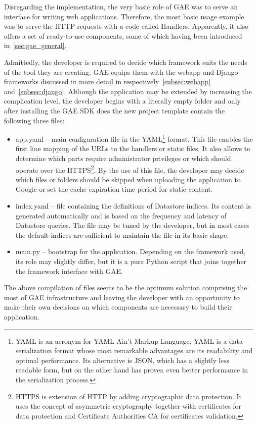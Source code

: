 Disregarding the implementation, the very basic role of GAE was to serve an interface for writing web applications. Therefore, the most basic usage example was to serve the HTTP requests with a code called Handlers. Apparently, it also offers a set of ready-to-use components, some of which having been introduced in~\ref{sec:gae_general}. 

Admittedly, the developer is required to decide which framework suits the needs of the tool they are creating. GAE equips them with the webapp and Django frameworks discussed in more detail in respectively~\ref{subsec:webapp} and~\ref{subsec:django}. Although the application may be extended by increasing the complication level, the developer begins with a literally empty folder and only after installing the GAE SDK does the new project template contain the following three files:
\begin{itemize}
\item{app.yaml} -- main configuration file in the YAML\footnote{YAML is an  acronym for YAML Ain't Markup Language. YAML is a data serialization format whose most remarkable advantages are its readability and optimal performance. Its alternative is JSON, which has a slightly less readable form, but on the other hand has proven even better performance in the serialization process.} format. This file enables the first line mapping of the URLs to the handlers or static files. It also allows to determine which parts require administrator privileges or which should operate over the HTTPS\footnote{HTTPS is extension of HTTP by adding cryptographic data protection. It uses the concept of asymmetric cryptography together with certificates for data protection and Certificate Authorities CA for certificates validation.}. By the use of this file, the developer may decide which files or folders should be skipped when uploading the application to Google or set the cache expiration time period for static content.   
\item{index.yaml} -- file containing the definitions of Datastore indices. Its content is generated automatically and is based on the frequency and latency of Datastore queries. The file may be tuned by the developer, but in most cases the default indices are sufficient to maintain the file in its basic shape.    
\item{main.py} -- bootstrap for the application. Depending on the framework used, its role may slightly differ, but it is a pure Python script that joins together the framework interface with GAE.  
\end{itemize}
The above compilation of files seems to be the optimum solution comprising the most of GAE infrastructure and leaving the developer with an opportunity to make their own decisions on which components are necessary to build their application.

